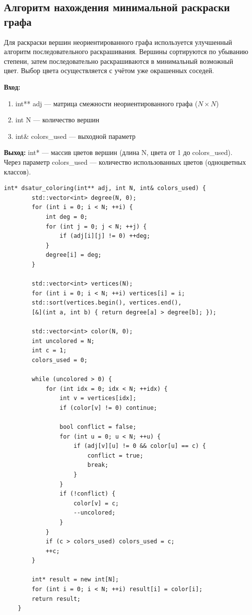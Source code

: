 \subsection{Алгоритм нахождения минимальной раскраски графа}
Для раскраски вершин неориентированного графа используется улучшенный алгоритм последовательного раскрашивания. Вершины сортируются по убыванию степени, затем последовательно раскрашиваются в минимальный возможный цвет. Выбор цвета осуществляется с учётом уже окрашенных соседей.

\noindent\textbf{Вход:}
\begin{enumerate}
	\item int** adj — матрица смежности неориентированного графа ($N \times N$)
	\item int N — количество вершин
	\item int\& colors\_used — выходной параметр
\end{enumerate}
\noindent\textbf{Выход:}
int* — массив цветов вершин (длина N, цвета от 1 до colors\_used). \\
Через параметр colors\_used — количество использованных цветов (одноцветных классов).

\begin{lstlisting}[caption=Раскраска графа (coloring.cpp)]
	int* dsatur_coloring(int** adj, int N, int& colors_used) {
		std::vector<int> degree(N, 0);
		for (int i = 0; i < N; ++i) {
			int deg = 0;
			for (int j = 0; j < N; ++j) {
				if (adj[i][j] != 0) ++deg;
			}
			degree[i] = deg;
		}
		
		std::vector<int> vertices(N);
		for (int i = 0; i < N; ++i) vertices[i] = i;
		std::sort(vertices.begin(), vertices.end(),
		[&](int a, int b) { return degree[a] > degree[b]; });
		
		std::vector<int> color(N, 0);
		int uncolored = N;
		int c = 1;
		colors_used = 0;
		
		while (uncolored > 0) {
			for (int idx = 0; idx < N; ++idx) {
				int v = vertices[idx];
				if (color[v] != 0) continue;
				
				bool conflict = false;
				for (int u = 0; u < N; ++u) {
					if (adj[v][u] != 0 && color[u] == c) {
						conflict = true;
						break;
					}
				}
				if (!conflict) {
					color[v] = c;
					--uncolored;
				}
			}
			if (c > colors_used) colors_used = c;
			++c;
		}
		
		int* result = new int[N];
		for (int i = 0; i < N; ++i) result[i] = color[i];
		return result;
	}
\end{lstlisting}

